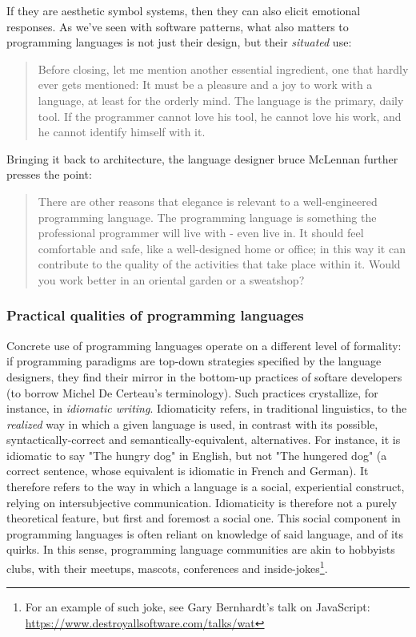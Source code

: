 \documentclass{article}
\begin{document}
If they are aesthetic symbol systems, then they can also elicit emotional responses. As we've seen with software patterns, what also matters to programming languages is not just their design, but their \emph{situated} use:

\begin{quote}
  Before closing, let me mention another essential ingredient, one that hardly ever gets mentioned: It must be a pleasure and a joy to work with a language, at least for the orderly mind. The language is the primary, daily tool. If the programmer cannot love his tool, he cannot love his work, and he cannot identify himself with it.\cite{wirth_essence_2003}
\end{quote}

Bringing it back to architecture, the language designer bruce McLennan further presses the point:

\begin{quote}
  There are other reasons that elegance is relevant to a well-engineered programming language. The programming language is something the professional programmer will live with - even live in. It should feel comfortable and safe, like a well-designed home or office; in this way it can contribute to the quality of the activities that take place within it. Would you work better in an oriental garden or a sweatshop?\cite{mclennan_who_nodate}
\end{quote}

\subsubsection{Practical qualities of programming languages}

Concrete use of programming languages operate on a different level of formality: if programming paradigms are top-down strategies specified by the language designers, they find their mirror in the bottom-up practices of softare developers (to borrow Michel De Certeau's terminology). Such practices crystallize, for instance, in \emph{idiomatic writing}. Idiomaticity refers, in traditional linguistics, to the \emph{realized} way in which a given language is used, in contrast with its possible, syntactically-correct and semantically-equivalent, alternatives. For instance, it is idiomatic to say "The hungry dog" in English, but not "The hungered dog" (a correct sentence, whose equivalent is idiomatic in French and German). It therefore refers to the way in which a language is a social, experiential construct, relying on intersubjective communication\cite{voloshinov_marxism_1986}. Idiomaticity is therefore not a purely theoretical feature, but first and foremost a social one. This social component in programming languages is often reliant on knowledge of said language, and of its quirks. In this sense, programming language communities are akin to hobbyists clubs, with their meetups, mascots, conferences and inside-jokes\footnote{For an example of such joke, see Gary Bernhardt's talk on JavaScript: \url{https://www.destroyallsoftware.com/talks/wat}}.
\end{document}
